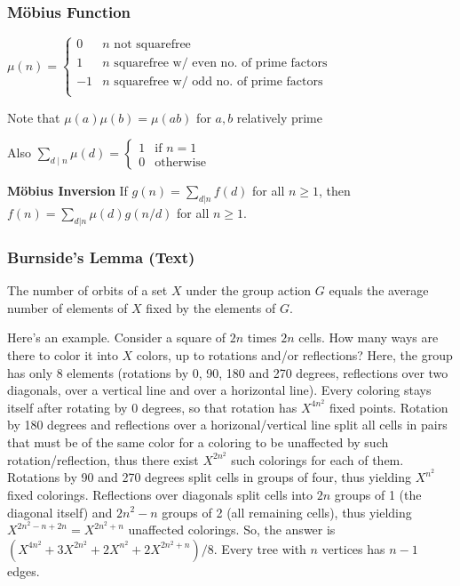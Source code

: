 \documentclass[12pt]{extarticle}
\begin{document}
\begin{multicols*}{2}
			\subsubsection*{M\"obius Function} %
			$\mu(n) = \begin{cases}
			0 & \text{$n$ not squarefree} \\
			1 & \text{$n$ squarefree w/ even no. of prime factors} \\
			-1 & \text{$n$ squarefree w/ odd no. of prime factors} \\
			\end{cases}$
			\par
			Note that $\mu(a) \mu(b) = \mu(ab)$ for $a, b$ relatively prime
			\par
			Also $\sum_{d \mid n} \mu(d) = \begin{cases} 1 & \text{if $n = 1$} \\
			0 & \text{otherwise} \end{cases}$
			
			\textbf{M\"obius Inversion}
			If $g(n) = \sum_{d|n} f(d)$ for all $n \ge 1$, then
			$f(n) = \sum_{d|n} \mu(d)g(n/d)$ for all $n \ge 1$.
			
			\par\vskip 7pt
			\subsubsection*{Burnside's Lemma (Text)} %
			The number of orbits of a set $X$ under the group action $G$ equals the average
			number of elements of $X$ fixed by the elements of $G$.
			
			Here's an example. Consider a square of $2n$ times $2n$ cells. How many ways
			are there to color it into $X$ colors, up to rotations and/or reflections?
			Here, the group has only 8 elements (rotations by 0, 90, 180 and 270 degrees,
			reflections over two diagonals, over a vertical line and over a horizontal
			line). Every coloring stays itself after rotating by 0 degrees, so that
			rotation has $X^{4n^2}$ fixed points. Rotation by 180 degrees and reflections
			over a horizonal/vertical line split all cells in pairs that must be of the
			same color for a coloring to be unaffected by such rotation/reflection, thus
			there exist $X^{2n^2}$ such colorings for each of them. Rotations by 90 and 270
			degrees split cells in groups of four, thus yielding $X^{n^2}$ fixed colorings.
			Reflections over diagonals split cells into $2n$ groups of 1 (the diagonal
			itself) and $2n^2-n$ groups of 2 (all remaining cells), thus yielding
			$X^{2n^2-n+2n}=X^{2n^2+n}$ unaffected colorings.  So, the answer is
			$(X^{4n^2}+3X^{2n^2}+2X^{n^2}+2X^{2n^2+n})/8$.
			Every tree with $n$ vertices has $n-1$ edges.
			\par\vskip 2pt

\end{multicols*}
\end{document}
